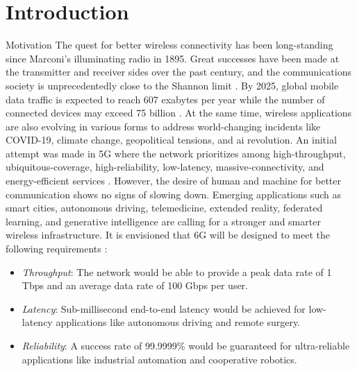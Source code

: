 
\graphicspath{{assets/chapter_1/}}

\chapter{Introduction}\label{ch:introduction}

\begin{section}{Motivation}
	The quest for better wireless connectivity has been long-standing since Marconi's illuminating radio in 1895.
	Great successes have been made at the transmitter and receiver sides over the past century, and the communications society is unprecedentedly close to the Shannon limit \cite{Shannon1948}.
	By 2025, global mobile data traffic is expected to reach {607} exabytes per year \cite{Tariq2020} while the number of connected devices may exceed {75} billion \cite{Georgiev2024}.
	At the same time, wireless applications are also evolving in various forms to address world-changing incidents like COVID-19, climate change, geopolitical tensions, and \gls{ai} revolution.
	An initial attempt was made in 5G where the network prioritizes among high-throughput, ubiquitous-coverage, high-reliability, low-latency, massive-connectivity, and energy-efficient services \cite{Shafi2017}.
	However, the desire of human and machine for better communication shows no signs of slowing down.
	Emerging applications such as smart cities, autonomous driving, telemedicine, extended reality, federated learning, and generative intelligence are calling for a stronger and smarter wireless infrastructure.
	It is envisioned that 6G will be designed to meet the following requirements \cite{Tataria2021,Alsabah2021,Jiang2021}:
	\begin{itemize}
		\item \emph{Throughput}: The network would be able to provide a peak data rate of 1 Tbps and an average data rate of 100 Gbps per user.
		\item \emph{Latency}: Sub-millisecond end-to-end latency would be achieved for low-latency applications like autonomous driving and remote surgery.
		\item \emph{Reliability}: A success rate of 99.9999\% would be guaranteed for ultra-reliable applications like industrial automation and cooperative robotics.

\end{itemize}
\end{section}
